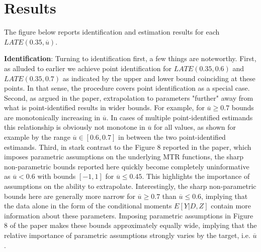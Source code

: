 \documentclass{article}
\begin{document}
\section{Results}
The figure below reports identification and estimation results for each $LATE(0.35, \overline{u})$.

\textbf{Identification}: Turning to identification first, a few things are noteworthy. 
First, as alluded to earlier we achieve point identification for $LATE(0.35, 0.6)$ and $LATE(0.35, 0.7)$ as indicated by the upper and lower bound coinciding at these points.
In that sense, the procedure covers point identification as a special case.
Second, as argued in the paper, extrapolation to parameters "further" away from what is point-identified results in wider bounds.
For example, for $\overline{u}\geq0.7$ bounds are monotonically increasing in $\overline{u}$. In cases of multiple point-identified estimands this relationship is obviously not monotone in $\overline{u}$ for all values, as shown for example by the range $\overline{u}\in[0.6, 0.7]$ in between the two point-identified estimands.
Third, in stark contrast to the Figure 8 reported in the paper, which imposes parametric assumptions on the underlying MTR functions, the sharp non-parametric bounds reported here quickly become completely uninformative as $\overline{u}<0.6$ with bounds $[-1,1]$ for $\overline{u}\leq0.45$. This highlights the importance of assumptions on the ability to extrapolate.
Interestingly, the sharp non-parametric bounds here are generally more narrow for $\overline{u}\geq0.7$ than $\overline{u}\leq0.6$, implying that the data alone in the form of the conditional moments $E[Y|D,Z]$ contain more information about these parameters.
Imposing parametric assumptions in Figure 8 of the paper makes these bounds approximately equally wide, implying that the relative importance of parametric assumptions strongly varies by the target, i.e. $\overline{u}$.
\end{document}

